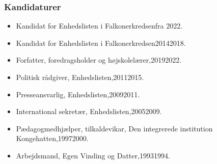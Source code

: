 \documentclass[11pt, a4paper]{awesome-cv}
\begin{document}
\begin{cvletter}
\subsubsection*{Kandidaturer}
\begin{itemize}
\item Kandidat for Enhedslisten i Falkonerkredsenfra 2022.
\item Kandidat for Enhedslisten i Falkonerkredsen20142018.
\end{itemize}
\begin{itemize}
\item Forfatter, foredragsholder og højskolelærer,20192022.
\item Politisk rådgiver, Enhedslisten,20112015.
\item Presseansvarlig, Enhedslisten,20092011.
\item International sekretær, Enhedslisten,20052009.
\item Pædagogmedhjælper, tilkaldevikar, Den integrerede institution Kongehatten,19972000.
\item Arbejdsmand, Egen Vinding og Datter,19931994.
\end{itemize}
\end{cvletter}
\end{document}
